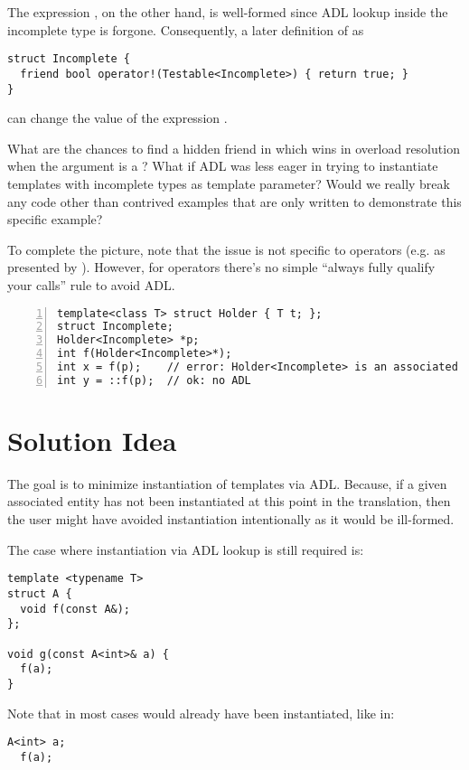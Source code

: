 
The expression , on the other hand, is well-formed since ADL lookup inside the 
incomplete type  is forgone. Consequently, a later definition of 
 as
\medskip\begin{lstlisting}[style=Vc]
struct Incomplete {
  friend bool operator!(Testable<Incomplete>) { return true; }
}
\end{lstlisting}
can change the value of the expression .

What are the chances to find a hidden friend  in  
which wins in overload resolution when the argument is a 
? What if ADL was less eager in trying to instantiate 
templates with incomplete types as template parameter? Would we really break any code 
other than contrived examples that are only written to demonstrate this specific example?

To complete the picture, note that the issue is not specific to operators (e.g. 
 as presented by \textcite{P2538R0}). However, for operators there's no 
simple “always fully qualify your calls” rule to avoid ADL.

\begin{lstlisting}[style=Vc,numbers=left,float,label=lst:example2,caption={
Minimal example triggering ill-formed instantiation
}]
template<class T> struct Holder { T t; };
struct Incomplete;
Holder<Incomplete> *p;
int f(Holder<Incomplete>*);
int x = f(p);    // error: Holder<Incomplete> is an associated entity
int y = ::f(p);  // ok: no ADL
\end{lstlisting}

\section{Solution Idea}
The goal is to minimize instantiation of templates via ADL. Because, if a given associated 
entity has not been instantiated at this point in the translation, then the user might 
have avoided instantiation intentionally as it would be ill-formed.

The case where instantiation via ADL lookup is still required is:
\medskip\begin{lstlisting}[style=Vc]
template <typename T>
struct A {
  void f(const A&);
};

void g(const A<int>& a) {
  f(a);
}
\end{lstlisting}
Note that in most cases  would already have been instantiated, like in:
\medskip\begin{lstlisting}[style=Vc]
  A<int> a;
  f(a);
\end{lstlisting}


